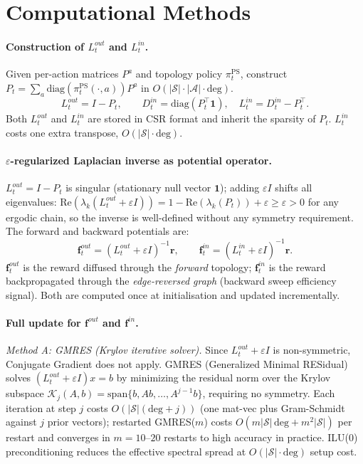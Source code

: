 \documentclass[10pt,a4paper]{article}
\begin{document}
\section{Computational Methods}


\paragraph{Construction of $L^{out}_t$ and $L^{in}_t$.}
Given per-action matrices $P^a$ and topology policy $\pi^{\mathrm{PS}}_t$, construct $P_t = \sum_a
\mathrm{diag}(\pi^{\mathrm{PS}}_t(\cdot,a))P^a$ in $O(|\mathcal{S}|\cdot|\mathcal{A}|\cdot\mathrm{deg})$.
\[
  L^{out}_t = I - P_t, \qquad
  D^{in}_t = \mathrm{diag}(P_t^\top\mathbf{1}), \quad L^{in}_t = D^{in}_t - P_t^\top.
\]
Both $L^{out}_t$ and $L^{in}_t$ are stored in CSR format and inherit the sparsity
of $P_t$.  $L^{in}_t$ costs one extra transpose, $O(|\mathcal{S}|\cdot\mathrm{deg})$.


\paragraph{$\varepsilon$-regularized Laplacian inverse as potential operator.}
$L^{out}_t = I - P_t$ is singular (stationary null vector $\mathbf{1}$); adding $\varepsilon I$
shifts all eigenvalues: $\mathrm{Re}(\lambda_k(L^{out}_t + \varepsilon I)) = 1 - \mathrm{Re}(\lambda_k(P_t)) + \varepsilon \geq \varepsilon > 0$
for any ergodic chain, so the inverse is well-defined without any symmetry requirement.
The forward and backward potentials are:
\[
  \mathbf{f}^{out}_t = (L^{out}_t + \varepsilon I)^{-1}\mathbf{r}, \qquad
  \mathbf{f}^{in}_t  = (L^{in}_t  + \varepsilon I)^{-1}\mathbf{r}.
\]
$\mathbf{f}^{out}_t$ is the reward diffused through the \emph{forward} topology;
$\mathbf{f}^{in}_t$ is the reward backpropagated through the \emph{edge-reversed graph}
(backward sweep efficiency signal).  Both are computed once at initialisation and
updated incrementally.


\paragraph{Full update for $\mathbf{f}^{out}$ and $\mathbf{f}^{in}$.}

\emph{Method A: GMRES (Krylov iterative solver).}
Since $L^{out}_t + \varepsilon I$ is non-symmetric, Conjugate Gradient does not apply.
GMRES (Generalized Minimal RESidual) solves $(L^{out}_t+\varepsilon I)x = b$ by minimizing
the residual norm over the Krylov subspace $\mathcal{K}_j(A,b) = \mathrm{span}\{b, Ab, \ldots, A^{j-1}b\}$,
requiring no symmetry.
Each iteration at step $j$ costs $O(|\mathcal{S}|(\mathrm{deg}+j))$
(one mat-vec plus Gram-Schmidt against $j$ prior vectors);
restarted GMRES($m$) costs $O(m|\mathcal{S}|\,\mathrm{deg} + m^2|\mathcal{S}|)$ per restart
and converges in $m = 10$--$20$ restarts to high accuracy in practice.
ILU(0) preconditioning reduces the effective spectral spread at $O(|\mathcal{S}|\cdot\mathrm{deg})$ setup cost.
\end{document}
